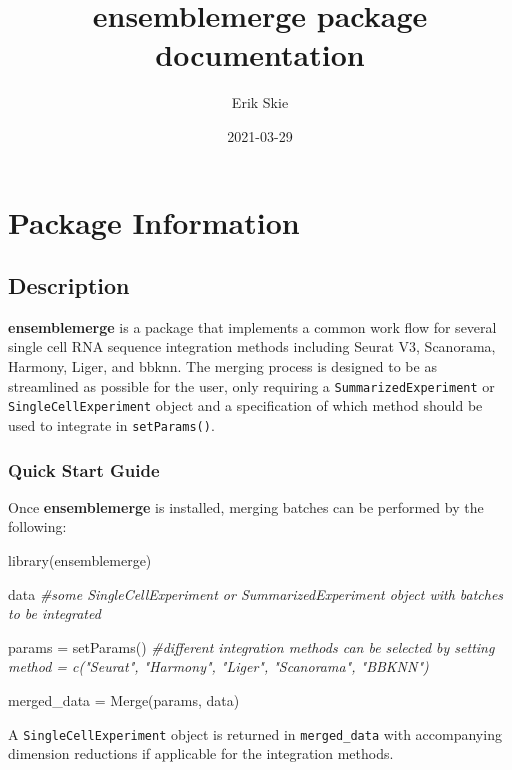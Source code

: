 \documentclass[
]{book}
\title{ensemblemerge package documentation}
\author{Erik Skie}
\date{2021-03-29}
\newenvironment{Shaded}{\begin{snugshade}}{\end{snugshade}}
\newcommand{\CommentTok}[1]{\textcolor[rgb]{0.56,0.35,0.01}{\textit{#1}}}
\newcommand{\FunctionTok}[1]{\textcolor[rgb]{0.00,0.00,0.00}{#1}}
\newcommand{\NormalTok}[1]{#1}
\newcommand{\OtherTok}[1]{\textcolor[rgb]{0.56,0.35,0.01}{#1}}
\begin{document}
\maketitle

{
\setcounter{tocdepth}{1}
\tableofcontents
}
\hypertarget{package-information}{%
\chapter{Package Information}\label{package-information}}

\hypertarget{description}{%
\section{Description}\label{description}}

\textbf{ensemblemerge} is a package that implements a common work flow for several single cell RNA sequence integration methods including Seurat V3, Scanorama, Harmony, Liger, and bbknn. The merging process is designed to be as streamlined as possible for the user, only requiring a \texttt{SummarizedExperiment} or \texttt{SingleCellExperiment} object and a specification of which method should be used to integrate in \texttt{setParams()}.

\hypertarget{quick-start-guide}{%
\subsection{Quick Start Guide}\label{quick-start-guide}}

Once \textbf{ensemblemerge} is installed, merging batches can be performed by the following:

\begin{Shaded}
\begin{Highlighting}[]
\FunctionTok{library}\NormalTok{(ensemblemerge)}

\NormalTok{data }\CommentTok{\#some SingleCellExperiment or SummarizedExperiment object with batches to be integrated}

\NormalTok{params }\OtherTok{=} \FunctionTok{setParams}\NormalTok{() }\CommentTok{\#different integration methods can be selected by setting method = c("Seurat", "Harmony", "Liger", "Scanorama", "BBKNN")}

\NormalTok{merged\_data }\OtherTok{=} \FunctionTok{Merge}\NormalTok{(params, data)}
\end{Highlighting}
\end{Shaded}

A \texttt{SingleCellExperiment} object is returned in \texttt{merged\_data} with accompanying dimension reductions if applicable for the integration methods.
\end{document}
